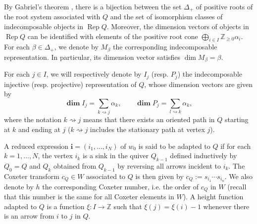 \documentclass[12pt]{amsart}
\theoremstyle{plain}
\theoremstyle{definition}
\numberwithin{equation}{section}
\DeclareMathOperator*{\rep}{Rep}
\DeclareMathOperator*{\dimvec}{\mathbf{dim}}
\begin{document}
By Gabriel's theorem \cite{Gab72}, there is a bijection between the set $\Delta_+$ of positive roots of the root system associated with $Q$ and the set of isomorphism classes of indecomposable objects in $\rep Q$. 
Moreover, the dimension vectors of objects in $\rep Q$ can be identified with elements of the positive root cone $\bigoplus_{i \in I} \mathbb{Z}_{\geq 0} \alpha_i$. For each $\beta \in \Delta_+$, we denote by $M_\beta$ the corresponding indecomposable representation. In particular, its dimension vector satisfies $\dim M_\beta = \beta$.

For each $j \in I$, we will respectively denote by $I_j$ (resp. $P_j$) the indecomposable injective (resp. projective) representation of $Q$, whose dimension vectors are given by 
   $$ \dimvec I_j = \sum_{k \rightsquigarrow j} \alpha_k,  \qquad \dimvec P_j = \sum_{l \rightsquigarrow k} \alpha_k, $$
   where the notation $k \rightsquigarrow j$ means that there exists an oriented path in $Q$ starting at $k$ and ending at $j$ (\(k \rightsquigarrow j\) includes the stationary path at vertex \(j\)). 

A reduced expression $\mathbf{i}=(i_1,\dots,i_N)$ of $w_0$ is said to be adapted to $Q$ if for each $k=1,\dots,N$, the vertex $i_k$ is a sink 
in the quiver $Q_{k-1}$ defined inductively by $Q_0=Q$ and $Q_k$ obtained 
from $Q_{k-1}$ by reversing all arrows incident to $i_k$. 
The Coxeter transform $c_Q \in W$ associated to $Q$ is then given by $c_Q := s_{i_1}\cdots s_{i_n}$. We also denote by $h$ the corresponding Coxeter number, i.e. the order of $c_Q$ in $W$ (recall that this number is the same for all Coxeter elements in $W$). 
A height function adapted to $Q$ is a function $\xi : I \longrightarrow \mathbb{Z}$ such that $\xi(j) = \xi(i)-1$ whenever there is an arrow from $i$ to $j$
 in $Q$. 

 
 
\end{document}
